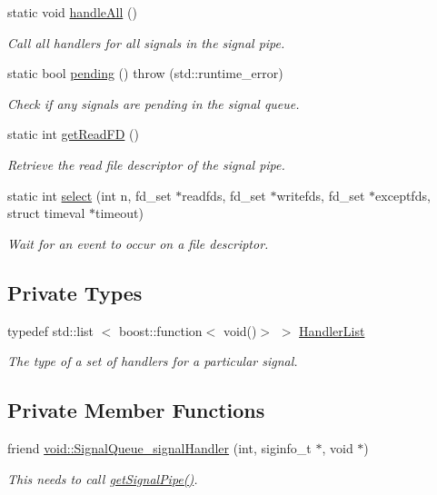 \begin{DoxyCompactItemize}
static void \hyperlink{classLibWheel_1_1SignalQueue_ad308bc4818a9d864bc0eb7b4dd1490ae}{handle\-All} ()
\begin{DoxyCompactList}\small\item\em \-Call all handlers for all signals in the signal pipe. \end{DoxyCompactList}\item 
static bool \hyperlink{classLibWheel_1_1SignalQueue_afd382f0a75d89bb0b6a22d9899c4435e}{pending} ()  throw (std\-::runtime\-\_\-error)
\begin{DoxyCompactList}\small\item\em \-Check if any signals are pending in the signal queue. \end{DoxyCompactList}\item 
static int \hyperlink{classLibWheel_1_1SignalQueue_a36582b3985b30c6620ed3476b97e8538}{get\-Read\-F\-D} ()
\begin{DoxyCompactList}\small\item\em \-Retrieve the read file descriptor of the signal pipe. \end{DoxyCompactList}\item 
static int \hyperlink{classLibWheel_1_1SignalQueue_a8ba3b23aab26d744bcc2bffcc6598921}{select} (int n, fd\-\_\-set $\ast$readfds, fd\-\_\-set $\ast$writefds, fd\-\_\-set $\ast$exceptfds, struct timeval $\ast$timeout)
\begin{DoxyCompactList}\small\item\em \-Wait for an event to occur on a file descriptor. \end{DoxyCompactList}\end{DoxyCompactItemize}
\subsection*{\-Private \-Types}
\begin{DoxyCompactItemize}
\item 
typedef std\-::list\*
$<$ boost\-::function$<$ void()$>$ $>$ \hyperlink{classLibWheel_1_1SignalQueue_a4bfc25c5e467e668c89ee0b0ceaa7591}{\-Handler\-List}
\begin{DoxyCompactList}\small\item\em \-The type of a set of handlers for a particular signal. \end{DoxyCompactList}\end{DoxyCompactItemize}
\subsection*{\-Private \-Member \-Functions}
\begin{DoxyCompactItemize}
\item 
friend \hyperlink{classLibWheel_1_1SignalQueue_ab219a09c14ff06e916c70dbdabdbf28a}{void\-::\-Signal\-Queue\-\_\-signal\-Handler} (int, siginfo\-\_\-t $\ast$, void $\ast$)
\begin{DoxyCompactList}\small\item\em \-This needs to call \hyperlink{classLibWheel_1_1SignalQueue_a522c461293731cec36208aa3bafe39c7}{get\-Signal\-Pipe()}. \end{DoxyCompactList}\end{DoxyCompactItemize}
